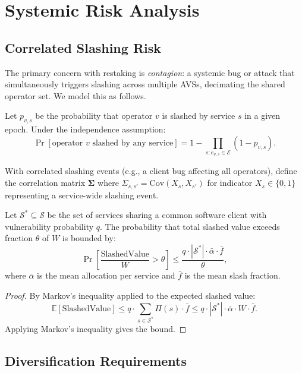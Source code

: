 \section{Systemic Risk Analysis}

\label{sec:risk}

\subsection{Correlated Slashing Risk}

The primary concern with restaking is \emph{contagion}: a systemic bug or attack that
simultaneously triggers slashing across multiple AVSs, decimating the shared operator set.
We model this as follows.

Let $p_{v,s}$ be the probability that operator $v$ is slashed by service $s$ in a given
epoch. Under the independence assumption:
\[
  \Pr[\text{operator } v \text{ slashed by any service}] = 1 - \prod_{s: e_{v,s} \in \mathcal{E}} (1 - p_{v,s}).
\]

With correlated slashing events (e.g., a client bug affecting all operators), define the
correlation matrix $\boldsymbol{\Sigma}$ where $\Sigma_{s,s'} = \text{Cov}(X_s, X_{s'})$
for indicator $X_s \in \{0,1\}$ representing a service-wide slashing event.

\begin{theorem}
\label{thm:systemic}
Let $\mathcal{S}^* \subseteq \mathcal{S}$ be the set of services sharing a common software
client with vulnerability probability $q$. The probability that total slashed value exceeds
fraction $\theta$ of $W$ is bounded by:
\[
  \Pr\left[\frac{\text{SlashedValue}}{W} > \theta\right] \leq \frac{q \cdot |\mathcal{S}^*| \cdot \bar{\alpha} \cdot \bar{f}}{\theta},
\]
where $\bar{\alpha}$ is the mean allocation per service and $\bar{f}$ is the mean slash
fraction.
\end{theorem}

\begin{proof}
By Markov's inequality applied to the expected slashed value:
\[
  \mathbb{E}[\text{SlashedValue}] \leq q \cdot \sum_{s \in \mathcal{S}^*} \Pi(s) \cdot \bar{f}
  \leq q \cdot |\mathcal{S}^*| \cdot \bar{\alpha} \cdot W \cdot \bar{f}.
\]
Applying Markov's inequality gives the bound.
\end{proof}

\subsection{Diversification Requirements}


